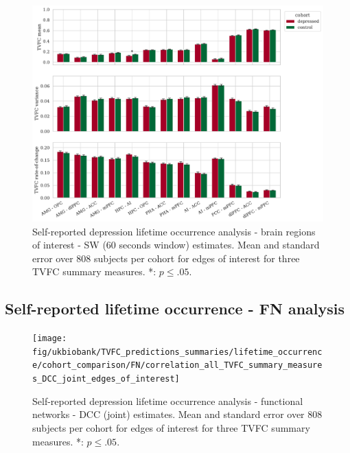 \begin{figure}[h]
    \centering
    \includegraphics[width=\textwidth]{fig/ukbiobank/TVFC_predictions_summaries/lifetime_occurrence/cohort_comparison/ROI/correlation_all_TVFC_summary_measures_SW_60_edges_of_interest}
    \caption{
        Self-reported depression lifetime occurrence analysis - brain regions of interest - SW (60 seconds window) estimates.
        Mean and standard error over 808 subjects per cohort for edges of interest for three TVFC summary measures.
        *: $p \leq .05$.
    }\label{fig:ukb-results-lo-roi-cohort-comparison-edges-of-interest-sw-60}
\end{figure}


\clearpage
\subsection{Self-reported lifetime occurrence - FN analysis}


\begin{figure}[h]
    \centering
    \texttt{[image: fig/ukbiobank/TVFC\_predictions\_summaries/lifetime\_occurrence/cohort\_comparison/FN/correlation\_all\_TVFC\_summary\_measures\_DCC\_joint\_edges\_of\_interest]}
    \caption{
        Self-reported depression lifetime occurrence analysis - functional networks - DCC (joint) estimates.
        Mean and standard error over 808 subjects per cohort for edges of interest for three TVFC summary measures.
        *: $p \leq .05$.
    }\label{fig:ukb-results-lo-fn-cohort-comparison-edges-of-interest-dcc-j}
\end{figure}


